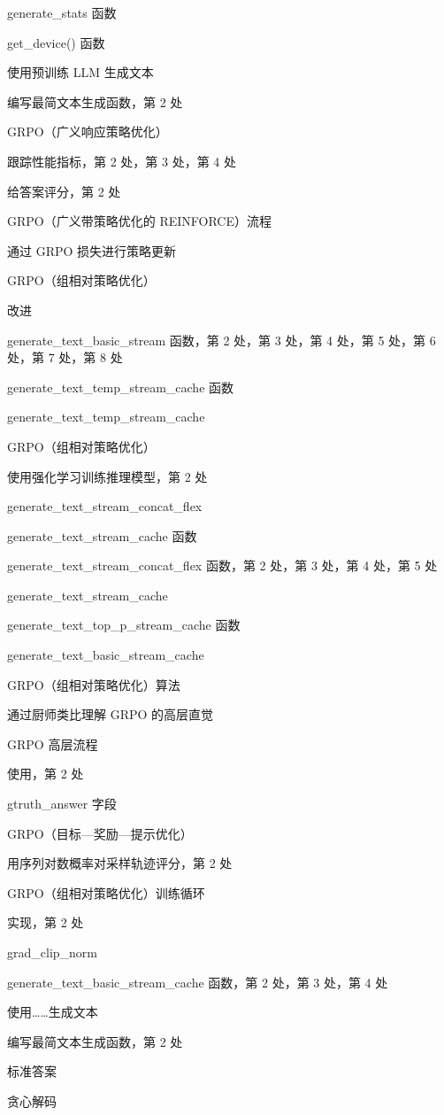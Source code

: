 generate\_stats 函数

get\_device() 函数

使用预训练 LLM 生成文本

编写最简文本生成函数，第 2 处

GRPO（广义响应策略优化）

跟踪性能指标，第 2 处，第 3 处，第 4 处

给答案评分，第 2 处

GRPO（广义带策略优化的 REINFORCE）流程

通过 GRPO 损失进行策略更新

GRPO（组相对策略优化）

改进

generate\_text\_basic\_stream 函数，第 2 处，第 3 处，第 4 处，第 5 处，第 6 处，第 7 处，第 8 处

generate\_text\_temp\_stream\_cache 函数

generate\_text\_temp\_stream\_cache

GRPO（组相对策略优化）

使用强化学习训练推理模型，第 2 处

generate\_text\_stream\_concat\_flex

generate\_text\_stream\_cache 函数

generate\_text\_stream\_concat\_flex 函数，第 2 处，第 3 处，第 4 处，第 5 处

generate\_text\_stream\_cache

generate\_text\_top\_p\_stream\_cache 函数

generate\_text\_basic\_stream\_cache

GRPO（组相对策略优化）算法

通过厨师类比理解 GRPO 的高层直觉

GRPO 高层流程

使用，第 2 处

gtruth\_answer 字段

GRPO（目标—奖励—提示优化）

用序列对数概率对采样轨迹评分，第 2 处

GRPO（组相对策略优化）训练循环

实现，第 2 处

grad\_clip\_norm

generate\_text\_basic\_stream\_cache 函数，第 2 处，第 3 处，第 4 处

使用……生成文本

编写最简文本生成函数，第 2 处

标准答案

贪心解码

